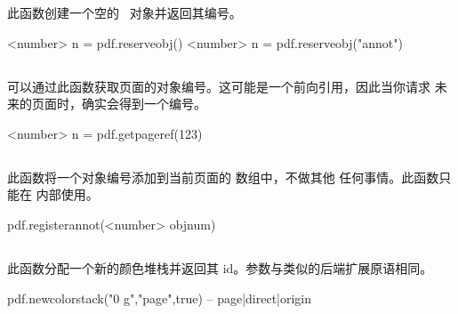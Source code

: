 

此函数创建一个空的 \PDF\ 对象并返回其编号。

\begin{typing}
<number> n = pdf.reserveobj()
<number> n = pdf.reserveobj("annot")
\end{typing}

\subsection{}



可以通过此函数获取页面的对象编号。这可能是一个前向引用，因此当你请求
未来的页面时，确实会得到一个编号。

\begin{typing}
<number> n = pdf.getpageref(123)
\end{typing}

\subsection{}



此函数将一个对象编号添加到当前页面的  数组中，不做其他
任何事情。此函数只能在  内部使用。

\begin{typing}
pdf.registerannot(<number> objnum)
\end{typing}

\subsection{}



此函数分配一个新的颜色堆栈并返回其 id。参数与类似的后端扩展原语相同。

\begin{typing}
pdf.newcolorstack("0 g","page",true) -- page|direct|origin
\end{typing}

\subsection{}

